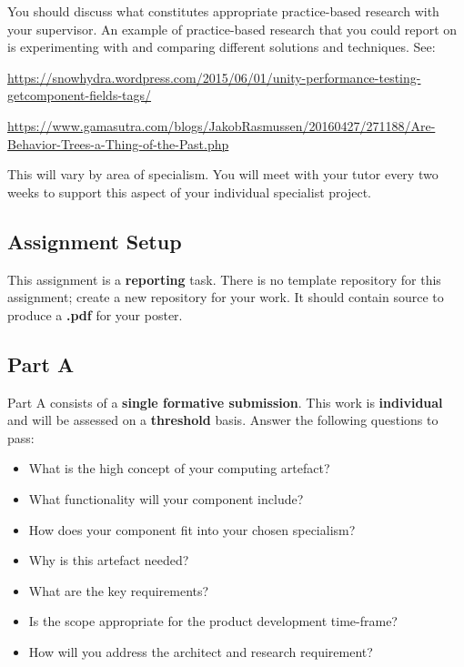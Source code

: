 \documentclass{../../fal_assignment}
\begin{document}
You should discuss what constitutes appropriate practice-based research with your supervisor. An example of practice-based research that you could report on is experimenting with and comparing different solutions and techniques. See:

\begin{sloppypar}
\url{https://snowhydra.wordpress.com/2015/06/01/unity-performance-testing-getcomponent-fields-tags/} 

\href{https://www.gamasutra.com/blogs/JakobRasmussen/20160427/271188/Are_Behavior_Trees_a_Thing_of_the_Past.php}{https://www.gamasutra.com/blogs/JakobRasmussen/20160427/271188/Are-Behavior-Trees-a-Thing-of-the-Past.php}
\end{sloppypar}

This will vary by area of specialism. You will meet with your tutor every two weeks to support this aspect of your individual specialist project.

\subsection*{Assignment Setup}

This assignment is a \textbf{reporting} task. There is no template repository for this assignment; create a new repository for your work. It should contain source to produce a \textbf{.pdf} for your poster.

\subsection*{Part A}

Part A consists of a \textbf{single formative submission}. This work is \textbf{individual} and will be assessed on a \textbf{threshold} basis. Answer the following questions to pass:

\begin{itemize}
	\item What is the high concept of your computing artefact?
	\item What functionality will your component include?
	\item How does your component fit into your chosen specialism?
	\item Why is this artefact needed?
	\item What are the key requirements?
	\item Is the scope appropriate for the product development time-frame?
	\item How will you address the architect and research requirement?
\end{itemize}
\end{document}
